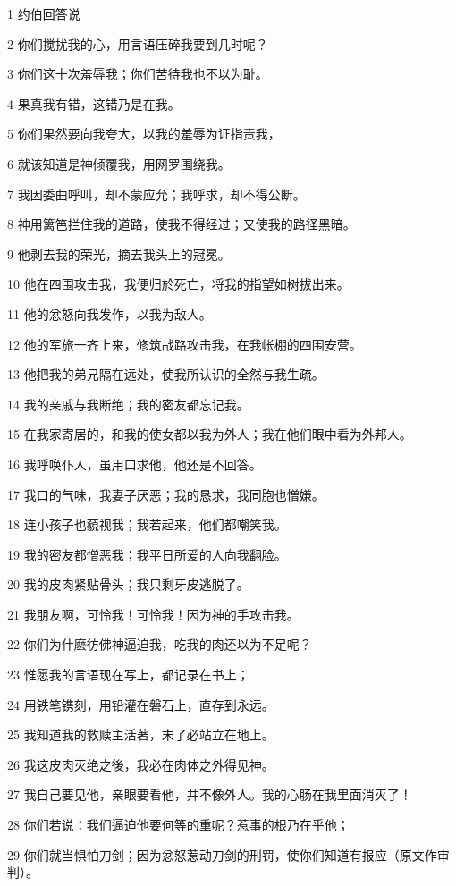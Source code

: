 \par 1 约伯回答说
\par 2 你们搅扰我的心，用言语压碎我要到几时呢？
\par 3 你们这十次羞辱我；你们苦待我也不以为耻。
\par 4 果真我有错，这错乃是在我。
\par 5 你们果然要向我夸大，以我的羞辱为证指责我，
\par 6 就该知道是神倾覆我，用网罗围绕我。
\par 7 我因委曲呼叫，却不蒙应允；我呼求，却不得公断。
\par 8 神用篱笆拦住我的道路，使我不得经过；又使我的路径黑暗。
\par 9 他剥去我的荣光，摘去我头上的冠冕。
\par 10 他在四围攻击我，我便归於死亡，将我的指望如树拔出来。
\par 11 他的忿怒向我发作，以我为敌人。
\par 12 他的军旅一齐上来，修筑战路攻击我，在我帐棚的四围安营。
\par 13 他把我的弟兄隔在远处，使我所认识的全然与我生疏。
\par 14 我的亲戚与我断绝；我的密友都忘记我。
\par 15 在我家寄居的，和我的使女都以我为外人；我在他们眼中看为外邦人。
\par 16 我呼唤仆人，虽用口求他，他还是不回答。
\par 17 我口的气味，我妻子厌恶；我的恳求，我同胞也憎嫌。
\par 18 连小孩子也藐视我；我若起来，他们都嘲笑我。
\par 19 我的密友都憎恶我；我平日所爱的人向我翻脸。
\par 20 我的皮肉紧贴骨头；我只剩牙皮逃脱了。
\par 21 我朋友啊，可怜我！可怜我！因为神的手攻击我。
\par 22 你们为什麽彷佛神逼迫我，吃我的肉还以为不足呢？
\par 23 惟愿我的言语现在写上，都记录在书上；
\par 24 用铁笔镌刻，用铅灌在磐石上，直存到永远。
\par 25 我知道我的救赎主活著，末了必站立在地上。
\par 26 我这皮肉灭绝之後，我必在肉体之外得见神。
\par 27 我自己要见他，亲眼要看他，并不像外人。我的心肠在我里面消灭了！
\par 28 你们若说：我们逼迫他要何等的重呢？惹事的根乃在乎他；
\par 29 你们就当惧怕刀剑；因为忿怒惹动刀剑的刑罚，使你们知道有报应（原文作审判）。

